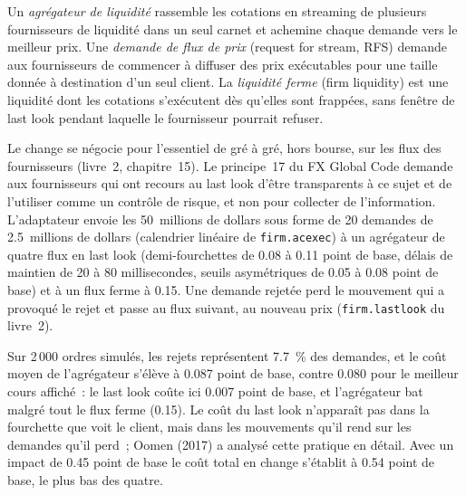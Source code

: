 \begin{definition}\label{def:mx:execution-beyond-equities:aggregator}
Un \emph{agrégateur de liquidité} rassemble les cotations en streaming de plusieurs fournisseurs de liquidité dans un seul carnet et achemine chaque
demande vers le meilleur prix. Une \emph{demande de flux de prix} (request for stream, RFS) demande aux fournisseurs de commencer à diffuser des prix exécutables pour une taille donnée
à destination d'un seul client. La \emph{liquidité ferme} (firm liquidity) est une liquidité dont les cotations s'exécutent dès qu'elles sont frappées, sans fenêtre de last look pendant laquelle le fournisseur
pourrait refuser.
\end{definition}

Le change se négocie pour l'essentiel de gré à gré, hors bourse, sur les flux des fournisseurs (livre~2, chapitre~15). Le principe~17 du FX Global Code demande aux fournisseurs
qui ont recours au last look d'être transparents à ce sujet et de l'utiliser comme un contrôle de risque, et non pour collecter de l'information. L'adaptateur envoie les 50~millions de dollars sous forme de 20
demandes de 2.5~millions de dollars (calendrier linéaire de \texttt{firm.acexec}) à un agrégateur de quatre flux en last look (demi-fourchettes de 0.08 à 0.11
point de base, délais de maintien de 20 à 80 millisecondes, seuils asymétriques de 0.05 à 0.08 point de base) et à un flux ferme à 0.15. Une demande rejetée perd
le mouvement qui a provoqué le rejet et passe au flux suivant, au nouveau prix (\texttt{firm.lastlook} du livre~2).

\label{lst:mx:execution-beyond-equities:fx}

Sur 2\,000 ordres simulés, les rejets représentent 7.7~\% des demandes, et le coût moyen de l'agrégateur s'élève à 0.087 point de base, contre
0.080 pour le meilleur cours affiché~: le last look coûte ici 0.007 point de base, et l'agrégateur bat malgré tout le flux ferme (0.15). Le coût du last look n'apparaît pas dans la fourchette
que voit le client, mais dans les mouvements qu'il rend sur les demandes qu'il perd~; Oomen (2017) a analysé cette pratique en détail. Avec un impact de 0.45 point de base
le coût total en change s'établit à 0.54 point de base, le plus bas des quatre.

